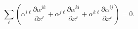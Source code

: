 \begin{equation}
    \label{eq:JacobiLocal}
    \sum_{\ell} \left(
        \alpha^{i\ell} \frac{\partial \alpha^{jk}}{\partial x^\ell}
        + \alpha^{j\ell} \frac{\partial \alpha^{ki}}{\partial x^\ell}
        + \alpha^{k\ell} \frac{\partial \alpha^{ij}}{\partial x^\ell}
    \right) = 0.
\end{equation}

